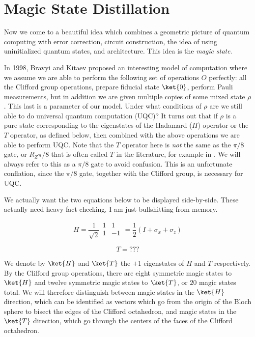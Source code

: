 \section{Magic State Distillation}
\label{sec:magic}

Now we come to a beautiful idea which combines a geometric picture of
quantum computing with error correction, circuit construction, the idea of
using uninitialized quantum states, and architecture.
This idea is the \emph{magic state}.

In 1998, Bravyi and Kitaev proposed an interesting model of computation where
we assume we are able to perform the following set of operations $O$
perfectly: all the Clifford group operations,
prepare fiducial state $\ket{0}$, perform Pauli measurements, but in
addition we are given multiple copies of some mixed state $\rho$. This last
is a parameter of our model. Under what conditions of $\rho$ are we still
able to do universal quantum computation (\textsc{UQC})? It turns out that
if $\rho$ is a pure state corresponding to the eigenstates of the Hadamard
($H$) operator or the $T$ operator, as defined below, then combined with the
above operations we are able to perform \textsc{UQC}. Note that the
$T$ operator here is \emph{not} the same as the $\pi/8$ gate, or $R_Z{\pi/8}$ that is
often called $T$ in the literature, for example in \cite{Nielsen2000}.
We will always refer to this as a $\pi/8$ gate to avoid confusion.
This is an unfortunate conflation, since the $\pi/8$ gate, together with the
Clifford group, is necessary for \textsc{UQC}.

We actually want the two equations below to be displayed side-by-side.
These actually need heavy fact-checking, I am just bullshitting from
memory.

\begin{displaymath}
H = \frac{1}{\sqrt{2}} \begin{array}{cc}
1 & 1 \\
1 & -1 \\
\end{array} = \frac{1}{2}(I + \sigma_x + \sigma_z)
\end{displaymath}

\begin{displaymath}
T = ???
\end{displaymath}

We denote by $\ket{H}$ and $\ket{T}$ the $+1$ eigenstates of $H$ and $T$
respectively. By the Clifford group operations, there are eight symmetric
magic states to $\ket{H}$ and twelve symmetric magic states to $\ket{T}$,
or $20$ magic states total. We will therefore distinguish between
magic states in the $\ket{H}$ direction, which can be identified as vectors
which go from the origin of the Bloch sphere to bisect the edges of the
Clifford octahedron, and magic states in the $\ket{T}$ direction, which
go through the centers of the faces of the Clifford octahedron.


